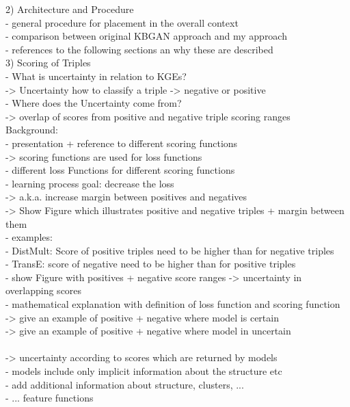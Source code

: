 2) Architecture and Procedure\\
- general procedure for placement in the overall context \\
- comparison between original KBGAN approach and my approach\\
- references to the following sections an why these are described\\

3) Scoring of Triples\\
- What is uncertainty in relation to KGEs?\\
-> Uncertainty how to classify a triple -> negative or positive\\
- Where does the Uncertainty come from?\\
-> overlap of scores from positive and negative triple scoring ranges\\
Background: \\
- presentation + reference to different scoring functions\\
-> scoring functions are used for loss functions\\
- different loss Functions for different scoring functions\\
- learning process goal: decrease the loss \\
-> a.k.a. increase margin between positives and negatives\\
-> Show Figure which illustrates positive and negative triples + margin between them\\
- examples:\\
    - DistMult: Score of positive triples need to be higher than for negative triples\\
    - TransE: score of negative need to be higher than for positive triples\\
- show Figure with positives + negative score ranges -> uncertainty in overlapping scores\\
- mathematical explanation with definition of loss function and scoring function\\
-> give an example of positive + negative where model is certain\\
-> give an example of positive + negative where model in uncertain\\\\

-> uncertainty according to scores which are returned by models\\
- models include only implicit information about the structure etc\\
- add additional information about structure, clusters, ...\\
- ... feature functions\\

